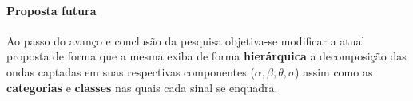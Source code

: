 \begin{frame}
	\framesubtitle{Proposta futura}
	\par Ao passo do avanço e conclusão da pesquisa objetiva-se modificar a atual proposta de forma que a mesma exiba de forma \textbf{hierárquica} a decomposição das ondas captadas em suas respectivas componentes ($\alpha, \beta, \theta, \sigma$) assim como as \textbf{categorias} e \textbf{classes} nas quais cada sinal se enquadra.
\end{frame}